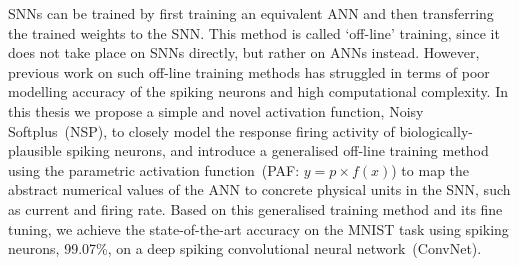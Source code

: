 



SNNs can be trained by first training an equivalent ANN and then transferring the trained weights to the SNN.
This method is called `off-line' training, since it does not take place on SNNs directly, but rather on ANNs instead.
However, previous work on such off-line training methods has struggled in terms of poor modelling accuracy of the spiking neurons and high computational complexity.
In this thesis we propose a simple and novel activation function, Noisy Softplus~(NSP), to closely model the response firing activity of biologically-plausible spiking neurons,
and introduce a generalised off-line training method using the parametric activation function~(PAF: $y = p \times f(x)$) to map the abstract numerical values of the ANN to concrete physical units in the SNN, such as current and firing rate.
Based on this generalised training method and its fine tuning, we achieve the state-of-the-art accuracy on the MNIST task using spiking neurons, 99.07\%, on a deep spiking convolutional neural network~(ConvNet).


